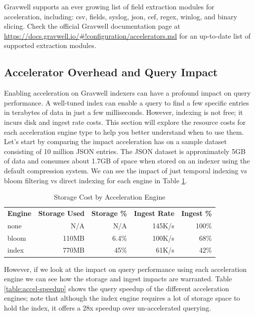 {Gravwell supports an ever growing list of field extraction modules for
acceleration, including: csv, fields, syslog, json, cef, regex, winlog,
and binary slicing. Check the official Gravwell documentation page at
\href{https://docs.gravwell.io/\#!configuration/accelerators.md}{https://docs.gravwell.io/\#!configuration/accelerators.md} for
an up-to-date list of supported extraction modules.

\subsection{Accelerator Overhead and Query Impact}

Enabling acceleration on Gravwell indexers can have a profound impact
on query performance. A well-tuned index can enable a query to find a
few specific entries in terabytes of data in just a few milliseconds.
However, indexing is not free; it incurs disk and ingest rate costs.
This section will explore the resource costs for each acceleration
engine type to help you better understand when to use them. Let's start
by comparing the impact acceleration has on a sample dataset consisting
of 10 million JSON entries. The JSON dataset is approximately 5GB of
data and consumes about 1.7GB of space when stored on an indexer using
the default compression system. We can see the impact of just temporal
indexing vs bloom filtering vs direct indexing for each engine in Table \ref{table:accel-storage}.

\begin{table}
\begin{tabular}{lrrrr}
	\hline
	\textbf{Engine} & \textbf{Storage Used} & \textbf{Storage \%} & \textbf{Ingest Rate} & \textbf{Ingest \%} \\
	none & N/A & N/A & 145K/s & 100\% \\
	bloom & 110MB & 6.4\% & 100K/s & 68\% \\
	index & 770MB & 45\% & 61K/s & 42\% \\
	\hline
\end{tabular}
\caption{Storage Cost by Acceleration Engine}
\label{table:accel-storage}
\end{table}

However, if we look at the impact on query performance using each
acceleration engine we can see how the storage and ingest impacts are
warranted. Table \ref{table:accel-speedup} shows the query speedup of
the different acceleration engines; note that although the index engine
requires a lot of storage space to hold the index, it offers a 28x speedup
over un-accelerated querying.

}
